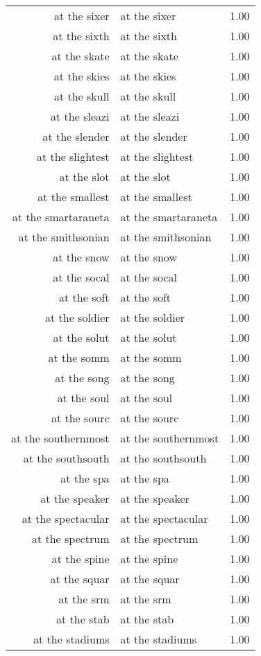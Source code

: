 \begin{table}[ht]
\begin{tabular}{rlr}
  at the sixer & at the sixer & 1.00 \\ 
  at the sixth & at the sixth & 1.00 \\ 
  at the skate & at the skate & 1.00 \\ 
  at the skies & at the skies & 1.00 \\ 
  at the skull & at the skull & 1.00 \\ 
  at the sleazi & at the sleazi & 1.00 \\ 
  at the slender & at the slender & 1.00 \\ 
  at the slightest & at the slightest & 1.00 \\ 
  at the slot & at the slot & 1.00 \\ 
  at the smallest & at the smallest & 1.00 \\ 
  at the smartaraneta & at the smartaraneta & 1.00 \\ 
  at the smithsonian & at the smithsonian & 1.00 \\ 
  at the snow & at the snow & 1.00 \\ 
  at the socal & at the socal & 1.00 \\ 
  at the soft & at the soft & 1.00 \\ 
  at the soldier & at the soldier & 1.00 \\ 
  at the solut & at the solut & 1.00 \\ 
  at the somm & at the somm & 1.00 \\ 
  at the song & at the song & 1.00 \\ 
  at the soul & at the soul & 1.00 \\ 
  at the sourc & at the sourc & 1.00 \\ 
  at the southernmost & at the southernmost & 1.00 \\ 
  at the southsouth & at the southsouth & 1.00 \\ 
  at the spa & at the spa & 1.00 \\ 
  at the speaker & at the speaker & 1.00 \\ 
  at the spectacular & at the spectacular & 1.00 \\ 
  at the spectrum & at the spectrum & 1.00 \\ 
  at the spine & at the spine & 1.00 \\ 
  at the squar & at the squar & 1.00 \\ 
  at the srm & at the srm & 1.00 \\ 
  at the stab & at the stab & 1.00 \\ 
  at the stadiums & at the stadiums & 1.00 \\ 

\end{tabular}
\end{table}
